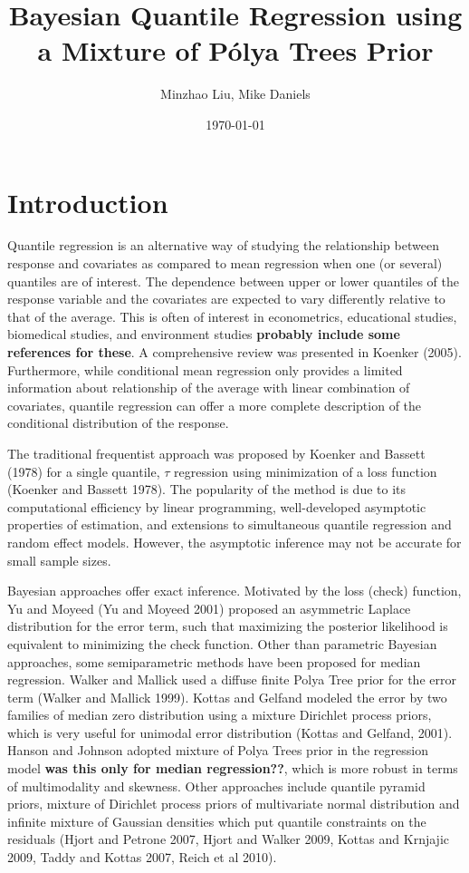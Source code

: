 \documentclass[12pt]{article}
\title{Bayesian Quantile Regression using a  Mixture of P\'{o}lya Trees Prior}
\date{\today}
\author{Minzhao Liu, Mike Daniels}
\begin{document}

\maketitle{}

\section{Introduction}

Quantile regression is an alternative way of studying the relationship
between response and covariates as compared to mean
regression when one (or several)
quantiles are of interest.  The dependence
between upper or lower quantiles of the response variable and the
covariates are expected to vary differently relative to that of the
average. This is often of interest in econometrics,
educational studies, biomedical studies, and environment
studies {\bf probably include some references for these}. 
A comprehensive review was presented in Koenker (2005). 
Furthermore, while conditional mean regression only provides a
limited information about relationship of the average with linear
combination of covariates,  quantile regression can offer a more
complete description of the conditional distribution of the response. 

The traditional frequentist approach was proposed by Koenker and
Bassett (1978) for a single quantile, $\tau$ regression using
minimization of a loss function (Koenker and Bassett 1978). The
popularity of the method is due 
to its computational efficiency by linear programming, well-developed
asymptotic properties of estimation, and extensions to
simultaneous quantile regression and random effect models. However,
the asymptotic inference may not be accurate  for small sample
sizes. 

Bayesian approaches offer exact
inference. Motivated by the loss (check) function, Yu and Moyeed (Yu and Moyeed
2001) proposed an asymmetric Laplace distribution for the error term,
such that maximizing the posterior likelihood  is equivalent to
minimizing the check function. Other than parametric Bayesian
approaches, some semiparametric methods have been proposed for median
regression. Walker and Mallick used a diffuse finite Polya Tree prior
for the error term (Walker and Mallick 1999). Kottas and Gelfand
modeled the error by two families of median zero distribution using a 
mixture Dirichlet process priors, which is very useful for unimodal
error distribution (Kottas and Gelfand, 2001). Hanson and Johnson
adopted mixture of Polya Trees prior in the regression model {\bf was
  this only for median regression??}, which is
more robust in terms of multimodality and skewness. Other approaches
include quantile pyramid priors, mixture of Dirichlet process priors
of multivariate normal distribution and infinite mixture of Gaussian
densities which put quantile constraints on the residuals (Hjort and
Petrone 2007, Hjort and 
Walker 2009, Kottas and Krnjajic 2009, Taddy and Kottas 2007, Reich et
al 2010). 
\end{document}

